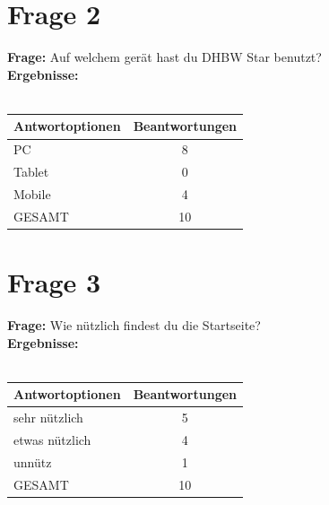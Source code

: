\section{Frage 2}
\begin{figure}
	\centering
\end{figure}
\textbf{Frage:} Auf welchem gerät hast du DHBW Star benutzt?\\
\textbf{Ergebnisse:}\\
\\
\begin{tabular}{|l|c|}\hline
	\textbf{Antwortoptionen} & \textbf{Beantwortungen} \\\hline
	PC 			& 8 \\\hline
	Tablet		& 0 \\\hline
	Mobile 		& 4 \\\hline
	GESAMT		& 10 \\\hline			
\end{tabular}

\section{Frage 3}
\begin{figure}
	\centering
\end{figure}

\textbf{Frage:} Wie nützlich findest du die Startseite?\\
\textbf{Ergebnisse:}\\
\\
\begin{tabular}{|l|c|}\hline
	\textbf{Antwortoptionen} & \textbf{Beantwortungen} \\\hline
	sehr nützlich  	& 5 \\\hline
	etwas nützlich	& 4 \\\hline
	unnütz 			& 1 \\\hline
	GESAMT			& 10 \\\hline			
\end{tabular}

